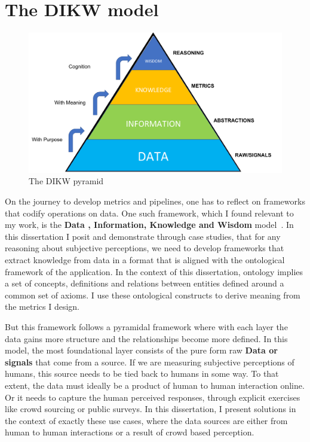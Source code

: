 \section{The DIKW model}

\begin{figure}[t!]
    \centering
    \includegraphics[width=\columnwidth]{DIKW.pdf}
    \caption{The DIKW pyramid}
    \label{fig:dikw}
\end{figure}

On the journey to develop metrics and pipelines, one has to reflect on frameworks that codify operations on data. One such framework, which I found relevant to my work, is the \textbf{Data , Information, Knowledge and Wisdom} model~\cite{rowley2007wisdom}. In this dissertation I posit and demonstrate through case studies, that for any reasoning about subjective perceptions, we need to develop frameworks that extract knowledge from data in a format that is aligned with the ontological framework of the application. In the context of this dissertation, ontology implies a set of concepts, definitions and relations between entities defined around a common set of axioms. I use these ontological constructs to derive meaning from the metrics I design. 

But this framework follows a pyramidal framework where with each layer the data gains more structure and the relationships become more defined. In this model, the most foundational layer consists of the pure form raw \textbf{Data or signals} that come from a source. If we are measuring subjective perceptions of humans, this source needs to be tied back to humans in some way. To that extent, the data must ideally be a product of human to human interaction online. Or it needs to capture the human perceived responses, through explicit exercises like crowd sourcing or public surveys. In this dissertation, I present solutions in the context of exactly these use cases, where the data sources are either from human to human interactions or a result of crowd based perception. 

